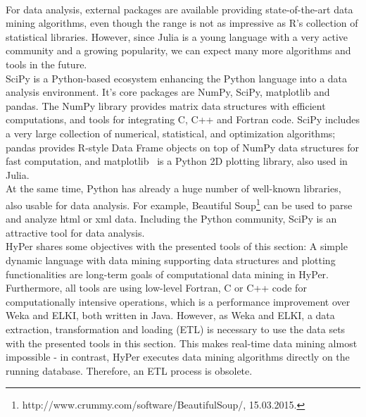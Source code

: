 \\
For data analysis, external packages are available providing state-of-the-art data mining algorithms, even though the range is not as impressive as R's collection of statistical libraries. However, since Julia is a young language with a very active community and a growing popularity, we can expect many more algorithms and tools in the future.
\\
SciPy is a Python-based ecosystem enhancing the Python language into a data analysis environment. It's core packages are NumPy, SciPy, matplotlib and pandas. The NumPy library provides matrix data structures with efficient computations, and tools for integrating C, C++ and Fortran code.
SciPy includes a very large collection of numerical, statistical, and optimization algorithms; pandas provides R-style Data Frame objects on top of NumPy data structures for fast computation, and matplotlib~\parencite{Hunter:2007} is a Python 2D plotting library, also used in Julia. 
\\
At the same time, Python has already a huge number of well-known libraries, also usable for data analysis. For example, Beautiful Soup\footnote{http://www.crummy.com/software/BeautifulSoup/, 15.03.2015.} can be used to parse and analyze html or xml data. Including the Python community, SciPy is an attractive tool for data analysis.
\\
HyPer shares some objectives with the presented tools of this section: A simple dynamic language with data mining supporting data structures and plotting functionalities are long-term goals of computational data mining in HyPer. Furthermore, all tools are using low-level Fortran, C or C++ code for computationally intensive operations, which is a performance improvement over Weka and ELKI, both written in Java. However, as Weka and ELKI, a data extraction, transformation and loading (ETL) is necessary to use the data sets with the presented tools in this section. This makes real-time data mining almost impossible - in contrast, HyPer executes data mining algorithms directly on the running database. Therefore, an ETL process is obsolete.


